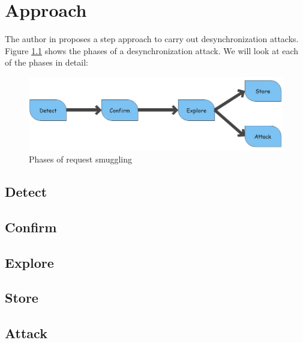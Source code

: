 \chapter{Approach}
The author in \cite{b6} proposes a step approach to carry out desynchronization attacks. Figure \ref{fig:Phases} shows the phases of a desynchronization attack. We will look at each of the phases in detail:
\begin{figure}
	\includegraphics[width=14cm]{images/Phases}
	\caption{Phases of request smuggling}
	\label{fig:Phases}
\end{figure}
\section{Detect}
\section{Confirm}
\section{Explore}
\section{Store}
\section{Attack}